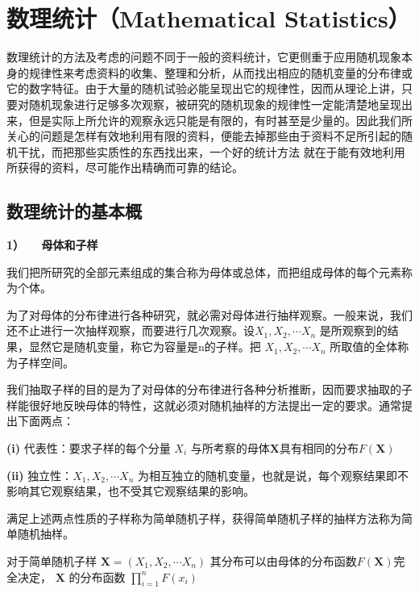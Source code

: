 
\section{数理统计（Mathematical Statistics）}

数理统计的方法及考虑的问题不同于一般的资料统计，它更侧重于应用随机现象本身的规律性来考虑资料的收集、整理和分析，从而找出相应的随机变量的分布律或它的数字特征。由于大量的随机试验必能呈现出它的规律性，因而从理论上讲，只要对随机现象进行足够多次观察，被研究的随机现象的规律性一定能清楚地呈现出来，但是实际上所允许的观察永远只能是有限的，有时甚至是少量的。因此我们所关心的问题是怎样有效地利用有限的资料，便能去掉那些由于资料不足所引起的随机干扰，而把那些实质性的东西找出来，一个好的统计方法 就在于能有效地利用所获得的资料，尽可能作出精确而可靠的结论。

\subsection{ 数理统计的基本概}
{\bf 1） \ \ 母体和子样 }

	我们把所研究的全部元素组成的集合称为母体或总体，而把组成母体的每个元素称为个体。
	
	为了对母体的分布律进行各种研究，就必需对母体进行抽样观察。一般来说，我们还不止进行一次抽样观察，而要进行几次观察。设$ X_{1}, X_{2}, \cdots X_{n} $ 是所观察到的结果，显然它是随机变量，称它为容量是n的子样。把 $ X_{1}, X_{2}, \cdots X_{n} $
	所取值的全体称为子样空间。
	
	我们抽取子样的目的是为了对母体的分布律进行各种分析推断，因而要求抽取的子样能很好地反映母体的特性，这就必须对随机抽样的方法提出一定的要求。通常提出下面两点：
	
	{\bf (i) } 代表性：要求子样的每个分量 $ X_{i} $ 与所考察的母体$  \boldsymbol{X} $具有相同的分布$  F( \boldsymbol{X} ) $
	
	{\bf (ii) }独立性：$ X_{1}, X_{2}, \cdots X_{n} $  为相互独立的随机变量，也就是说，每个观察结果即不影响其它观察结果，也不受其它观察结果的影响。
	
	满足上述两点性质的子样称为简单随机子样，获得简单随机子样的抽样方法称为简单随机抽样。
	
	对于简单随机子样 $ \boldsymbol{X} = (X_{1}, X_{2}, \cdots X_{n})  $  其分布可以由母体的分布函数$  F( \boldsymbol{X} ) $完全决定，
	$ \boldsymbol{X} $ 的分布函数
	$ \prod_{i=1}^{n} F\left(x_{i}\right) $

